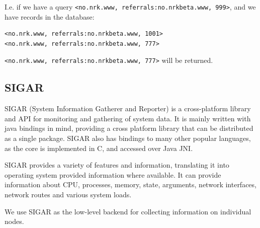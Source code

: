 I.e. if we have a query \texttt{<no.nrk.www, referrals:no.nrkbeta.www, 999>}, and we have records in the database:
\begin{lstlisting}
<no.nrk.www, referrals:no.nrkbeta.www, 1001>
<no.nrk.www, referrals:no.nrkbeta.www, 777>
\end{lstlisting}
\texttt{<no.nrk.www, referrals:no.nrkbeta.www, 777>} will be returned.

\subsection{SIGAR}
SIGAR (System Information Gatherer and Reporter)\cite{sigar} is a cross-platform library and API for monitoring and gathering of system data. It is mainly written with java bindings in mind, providing a cross platform library that can be distributed as a single package. SIGAR also has bindings to many other popular languages, as the core is implemented in C, and accessed over Java JNI.

SIGAR provides a variety of features and information, translating it into operating system provided information where available. It can provide information about CPU, processes, memory, state, arguments, network interfaces, network routes and various system loads.

We use SIGAR as the low-level backend for collecting information on individual nodes.


